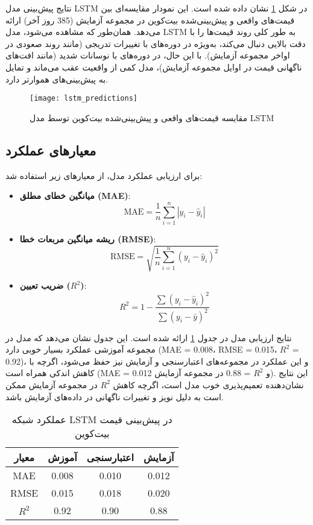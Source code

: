 نتایج پیش‌بینی مدل LSTM در شکل \ref{fig:lstm_predictions} نشان داده شده است. این نمودار مقایسه‌ای بین قیمت‌های واقعی و پیش‌بینی‌شده بیت‌کوین در مجموعه آزمایش (385 روز آخر) ارائه می‌دهد. همان‌طور که مشاهده می‌شود، مدل LSTM به طور کلی روند قیمت‌ها را با دقت بالایی دنبال می‌کند، به‌ویژه در دوره‌های با تغییرات تدریجی (مانند روند صعودی در اواخر مجموعه آزمایش). با این حال، در دوره‌های با نوسانات شدید (مانند افت‌های ناگهانی قیمت در اوایل مجموعه آزمایش)، مدل کمی از واقعیت عقب می‌ماند و تمایل به پیش‌بینی‌های هموارتر دارد.

\begin{figure}[H]
	\centering
	\texttt{[image: lstm\_predictions]}
	\caption{مقایسه قیمت‌های واقعی و پیش‌بینی‌شده بیت‌کوین توسط مدل LSTM}
	\label{fig:lstm_predictions}
\end{figure}

\subsection{معیارهای عملکرد}
برای ارزیابی عملکرد مدل، از معیارهای زیر استفاده شد:
\begin{itemize}
	\item \textbf{میانگین خطای مطلق (MAE)}:
	\begin{equation}
		\text{MAE} = \frac{1}{n} \sum_{i=1}^n |y_i - \hat{y}_i|
	\end{equation}
	\item \textbf{ریشه میانگین مربعات خطا (RMSE)}:
	\begin{equation}
		\text{RMSE} = \sqrt{\frac{1}{n} \sum_{i=1}^n (y_i - \hat{y}_i)^2}
	\end{equation}
	\item \textbf{ضریب تعیین (\(R^2\))}:
	\begin{equation}
		R^2 = 1 - \frac{\sum (y_i - \hat{y}_i)^2}{\sum (y_i - \bar{y})^2}
	\end{equation}
\end{itemize}

نتایج ارزیابی مدل در جدول \ref{tab:lstm_performance} ارائه شده است. این جدول نشان می‌دهد که مدل در مجموعه آموزشی عملکرد بسیار خوبی دارد (MAE = 0.008، RMSE = 0.015، \(R^2\) = 0.92)، و این عملکرد در مجموعه‌های اعتبارسنجی و آزمایش نیز حفظ می‌شود، اگرچه با کاهش اندکی همراه است (MAE = 0.012 و \(R^2\) = 0.88 در مجموعه آزمایش). این نتایج نشان‌دهنده تعمیم‌پذیری خوب مدل است، اگرچه کاهش \(R^2\) در مجموعه آزمایش ممکن است به دلیل نویز و تغییرات ناگهانی در داده‌های آزمایش باشد.

\begin{table}[H]
	\centering
	\begin{tabular}{|c|c|c|c|}
		\hline
		\textbf{معیار} & \textbf{آموزش} & \textbf{اعتبارسنجی} & \textbf{آزمایش} \\
		\hline
		MAE & 0.008 & 0.010 & 0.012 \\
		RMSE & 0.015 & 0.018 & 0.020 \\
		\(R^2\) & 0.92 & 0.90 & 0.88 \\
		\hline
	\end{tabular}
	\caption{عملکرد شبکه LSTM در پیش‌بینی قیمت بیت‌کوین}
	\label{tab:lstm_performance}
\end{table}

